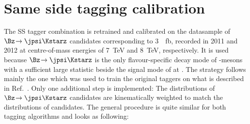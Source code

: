 \section{Same side tagging calibration}
\label{sec:SScalibration}

The SS tagger combination is retrained and calibrated on the datasample of $\Bz\!\to\jpsi\Kstarz$ candidates corresponding to \SI{3}{\per\femto\barn}, recorded in \num{2011} and \num{2012} at centre-of-mass energies of \SI{7}{\tera\electronvolt} and \SI{8}{\tera\electronvolt}, respectively.
It is used because $\Bz\!\to\jpsi\Kstarz$ is the only flavour-specific decay mode of \Bz-mesons with a sufficient large statistic beside the signal mode of \BdToDpi at \lhcb.
The strategy follows mainly the one which was used to train the original taggers on \BdToDpi what is described in Ref.~\cite{Aaij:2016rdg}.
Only one additional step is implemented:
The distributions of $\Bz\!\to\jpsi\Kstarz$ candidates are kinematically weighted to match the distributions of \BdToDpi candidates.
The general procedure is quite similar for both tagging algorithms and looks as following:
